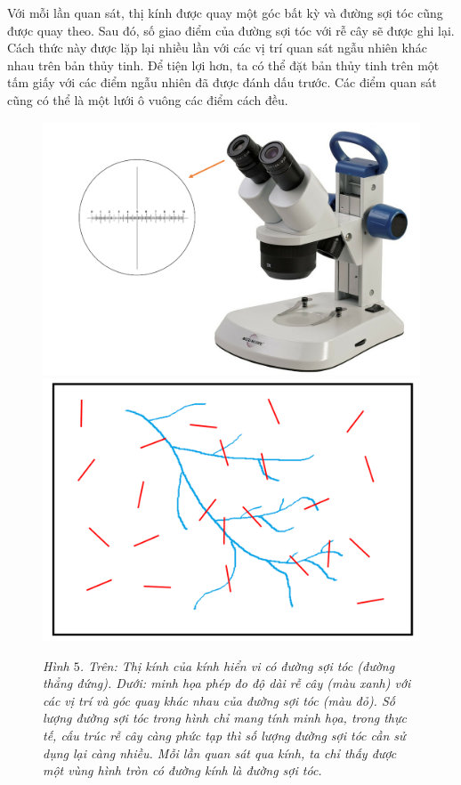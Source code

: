 \begin{multicols}{2}
	\vskip 0.1cm
	Với mỗi lần quan sát, thị kính được quay một góc bất kỳ và đường sợi tóc cũng được quay theo. Sau đó, số giao điểm của đường sợi tóc với rễ cây sẽ được ghi lại. Cách thức này được lặp lại nhiều lần với các vị trí quan sát ngẫu nhiên khác nhau trên bản thủy tinh. Để tiện lợi hơn, ta có thể đặt bản thủy tinh trên một tấm giấy với các điểm ngẫu nhiên đã được đánh dấu trước. Các điểm quan sát cũng có thể là một lưới ô vuông các điểm cách đều.
	\begin{figure}[H]
		\centering
		\captionsetup{labelformat= empty, justification=centering}
		\includegraphics[width=1\linewidth]{7}
		\includegraphics[width=1\linewidth]{8}
		\caption{\small\textit{\color{toanhocdoisong}Hình $5$. Trên: Thị kính của kính hiển vi có đường sợi tóc (đường thẳng đứng). Dưới: minh họa phép đo độ dài rễ cây (màu xanh) với các vị trí và góc quay khác nhau của đường sợi tóc (màu đỏ). Số lượng đường sợi tóc trong hình chỉ mang tính minh họa, trong thực tế, cấu trúc rễ cây càng phức tạp thì số lượng đường sợi tóc cần sử dụng lại càng nhiều. Mỗi lần quan sát qua kính, ta chỉ thấy được một vùng hình tròn có đường kính là đường sợi tóc.}}

\end{figure}
\end{multicols}
